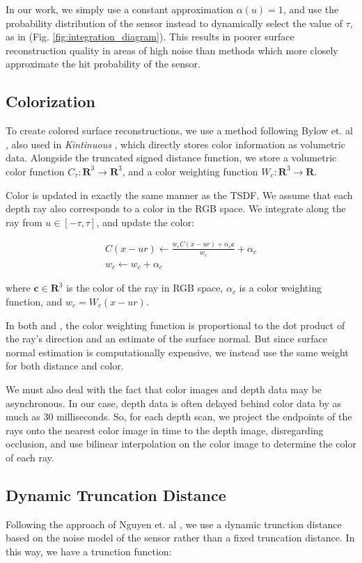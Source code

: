 \documentclass[conference,10pt]{IEEEtran}
\begin{document}
In our work, we simply use a constant approximation $\alpha(u) = 1$, and use the
probability distribution of the sensor instead to  dynamically select the value
of $\tau$, as in \cite{Nguyen2012} (Fig. \ref{fig:integration_diagram}). This results in
poorer surface reconstruction quality in areas of high noise than methods which
more closely approximate the hit probability of the sensor.

\subsection{Colorization}
To create colored surface reconstructions, we use a method following Bylow et.
al \cite{Bylow2013}, also used in \textit{Kintinuous} \cite{Whelan2013}, which
directly stores color information as volumetric data. Alongside the
truncated signed distance function, we store a volumetric color function
$C_\tau : \mathbf{R}^3 \to \mathbf{R}^3$, and a color weighting function $W_c :
\mathbf{R}^3 \to \mathbf{R}$.

Color is updated in exactly the same manner as the TSDF. We assume that each
depth ray also corresponds to a color in the RGB space. We integrate along the
ray from $u \in [-\tau, \tau]$, and update the color:

\begin{align*}
C(x - ur) \gets \frac{w_c C(x - ur) + \alpha_c \mathbf{c}}{w_c}
+\alpha_c
\\
%
w_c \gets w_c + \alpha_c
\end{align*}

\noindent where $\mathbf{c} \in \mathbf{R}^3$ is the color of the ray in RGB
space, $\alpha_c$ is a color weighting function, and $w_c = W_c(x -
ur)$.

In both \cite{Bylow2013} and \cite{Whelan2013}, the color weighting function is
proportional to the dot product of the ray's direction and an estimate of the
surface normal. But since surface normal estimation is computationally
expensive, we instead use the same weight for both distance and color.

We must also deal with the fact that color images and depth data may be
asynchronous. In our case, depth data is often delayed behind color data by as
much as 30 milliseconds. So, for each depth scan, we project the endpoints of
the rays onto the nearest color image in time to the depth image, disregarding
occlusion, and use bilinear interpolation on the color image to determine the
color of each ray.

\subsection{Dynamic Truncation Distance}
Following the approach of Nguyen et. al \cite{Nguyen2012}, we use a dynamic
trunction distance based on the noise model of the sensor rather than a fixed
truncation distance. In this way, we have a trunction function:
\end{document}
